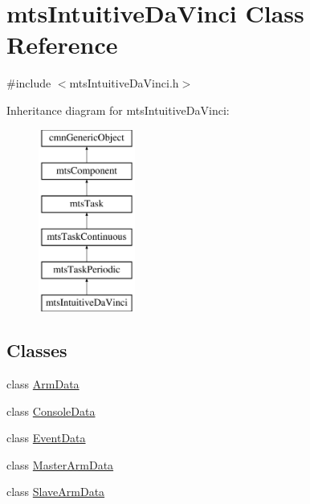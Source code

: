 \hypertarget{classmts_intuitive_da_vinci}{}\section{mts\+Intuitive\+Da\+Vinci Class Reference}
\label{classmts_intuitive_da_vinci}


{\ttfamily \#include $<$mts\+Intuitive\+Da\+Vinci.\+h$>$}

Inheritance diagram for mts\+Intuitive\+Da\+Vinci\+:\begin{figure}[H]
\begin{center}
\leavevmode
\includegraphics[height=6.000000cm]{dd/db7/classmts_intuitive_da_vinci}
\end{center}
\end{figure}
\subsection*{Classes}
\begin{DoxyCompactItemize}
\item 
class \hyperlink{classmts_intuitive_da_vinci_1_1_arm_data}{Arm\+Data}
\item 
class \hyperlink{classmts_intuitive_da_vinci_1_1_console_data}{Console\+Data}
\item 
class \hyperlink{classmts_intuitive_da_vinci_1_1_event_data}{Event\+Data}
\item 
class \hyperlink{classmts_intuitive_da_vinci_1_1_master_arm_data}{Master\+Arm\+Data}
\item 
class \hyperlink{classmts_intuitive_da_vinci_1_1_slave_arm_data}{Slave\+Arm\+Data}
\end{DoxyCompactItemize}
